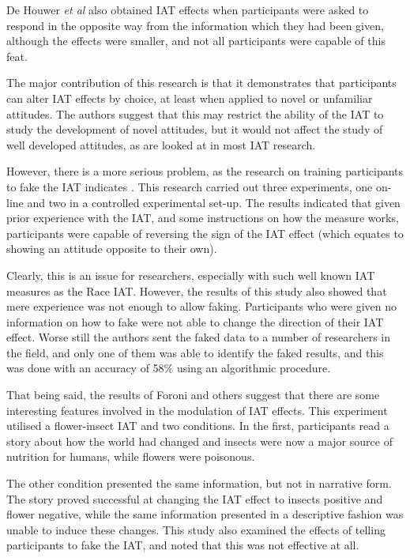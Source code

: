 De Houwer \textit{et al} also obtained IAT effects when participants were asked to respond in the opposite way from the information which they had been given, although the effects were smaller, and not all participants were capable of this feat.  

The major contribution of this research is that it demonstrates that participants can alter IAT effects by choice, at least when applied to novel or unfamiliar attitudes. The authors suggest that this may restrict the ability of the IAT to study the development of novel attitudes, but it would not affect the study of well developed attitudes, as are looked at in most IAT research.

However, there is a more serious problem, as the research on training participants to fake the IAT indicates \cite{Fiedler2005}. This research carried out three experiments, one on-line and two in a controlled experimental set-up. The results indicated that given prior experience with the IAT, and some instructions on how the measure works, participants were capable of reversing the sign of the IAT effect (which equates to showing an attitude opposite to their own). 

Clearly, this is an issue for researchers, especially with such well known IAT measures as the Race IAT. However, the results of this study also showed that mere experience was not enough to allow faking. Participants who were given no information on how to fake were not able to change the direction of their IAT effect. Worse still the authors sent the faked data to a number of researchers in the field, and only one of them was able to identify the faked results, and this was done with an accuracy of 58\% using an algorithmic procedure.   

That being said, the results of Foroni and others \cite{Foroni2005}  suggest that there are some interesting features involved in the modulation of IAT effects. This experiment utilised a flower-insect IAT \cite{Greenwald1998} and two conditions. In the first, participants read a story about how the world had changed and insects were now a major source of nutrition for humans, while flowers were poisonous. 

The other condition presented the same information, but not in narrative form. The story proved successful at changing the IAT effect to insects positive and flower negative, while the same information presented in a descriptive fashion was unable to induce these changes. This study also examined the effects of telling participants to fake the IAT, and noted that this was not effective at all. 

